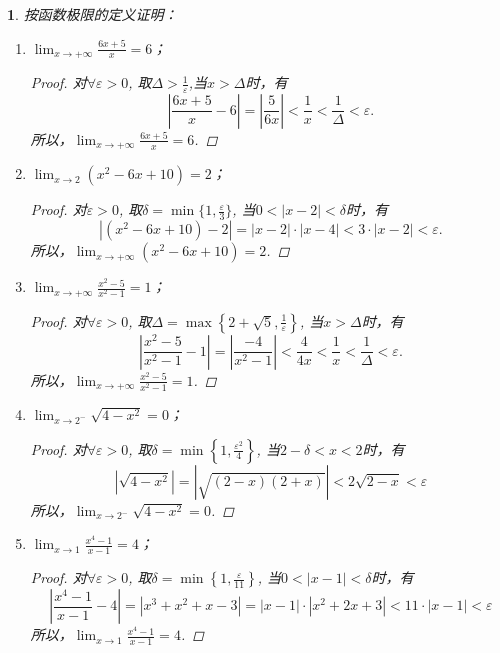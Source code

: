 \documentclass[utf8]{book}
\newtheorem{example}{}[section]             %
\begin{document}
\begin{example}
按函数极限的定义证明：
\renewcommand\labelenumi{\normalfont(\theenumi)}
\begin{enumerate}
\item $\displaystyle\lim_{x\to +\infty}\frac{6x+5}{x} = 6$；
\begin{proof}对$\forall \varepsilon > 0$, 取$\Delta >\frac{1}{\varepsilon}$,当$x > \Delta$时，有
$$\left|\frac{6x+5}{x} - 6 \right| = \left|\frac{5}{6x}\right| < \frac{1}{x} <\frac{1}{\Delta}< \varepsilon.$$
所以，$\displaystyle\lim_{x\to +\infty}\frac{6x+5}{x} = 6$.
\end{proof}
\item $\displaystyle\lim_{x\to 2}(x^2-6x+10) = 2$；
\begin{proof}对$\varepsilon > 0$, 取$\delta = \min\{1, \frac{\varepsilon}{3}\}$, 当$0<|x-2|<\delta$时，有
$$\left|(x^2-6x+10) - 2\right| = \left|x - 2\right|\cdot\left|x - 4\right| < 3\cdot\left|x - 2\right| <\varepsilon.$$
所以，$\displaystyle\lim_{x\to +\infty}(x^2-6x+10) = 2$.
\end{proof}
\item $\displaystyle\lim_{x\to +\infty}\frac{x^2-5}{x^2-1} = 1$；
\begin{proof}对$\forall \varepsilon > 0$, 取$\Delta = \max\left\{2+ \sqrt{5}, \frac{1}{\varepsilon}\right\}$, 当$x >\Delta$时，有
$$\left|\frac{x^2-5}{x^2-1} - 1\right| = \left|\frac{-4}{x^2-1}\right| <\frac{4}{4x} <\frac{1}{x}<\frac{1}{\Delta}<\varepsilon.$$
所以，$\displaystyle\lim_{x\to +\infty}\frac{x^2-5}{x^2-1} = 1$.
\end{proof}
\item $\displaystyle\lim_{x\to 2^{-}}\sqrt{4-x^2} = 0$；
\begin{proof}对$\forall \varepsilon > 0$, 取$\delta = \min\left\{1, \frac{\varepsilon^2}{4}\right\}$, 当$2-\delta < x < 2$时，有
$$\left|\sqrt{4-x^2}\right| = \left|\sqrt{(2-x)(2+x)}\right| < 2\sqrt{2-x}<\varepsilon$$
所以，$\displaystyle\lim_{x\to 2^{-}}\sqrt{4-x^2} = 0$.
\end{proof}
\item $\displaystyle\lim_{x\to 1}\frac{x^4-1}{x-1} = 4$；
\begin{proof}对$\forall \varepsilon > 0$, 取$\delta = \min\left\{1, \frac{\varepsilon}{11}\right\}$, 当$0<\left|x-1\right| < \delta$时，有
$$\left|\frac{x^4-1}{x-1} - 4\right| = \left|x^3 + x^2 + x - 3\right| = \left|x-1\right|\cdot \left|x^2+2x+3\right|< 11\cdot\left|x-1\right| < \varepsilon$$
所以，$\displaystyle\lim_{x\to 1}\frac{x^4-1}{x-1} = 4$.
\end{proof}

\end{enumerate}
\end{example}
\end{document}
